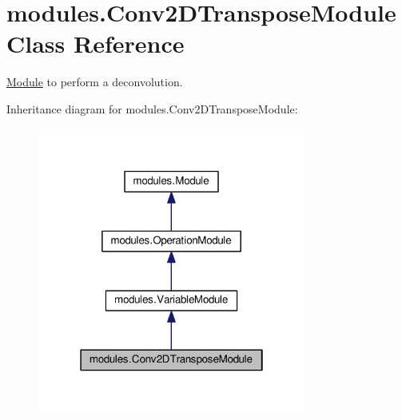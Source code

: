 \hypertarget{classmodules_1_1_conv2_d_transpose_module}{}\section{modules.\+Conv2\+D\+Transpose\+Module Class Reference}
\label{classmodules_1_1_conv2_d_transpose_module}


\hyperlink{classmodules_1_1_module}{Module} to perform a deconvolution.  




Inheritance diagram for modules.\+Conv2\+D\+Transpose\+Module\+:\nopagebreak
\begin{figure}[H]
\begin{center}
\leavevmode
\includegraphics[width=250pt]{classmodules_1_1_conv2_d_transpose_module__inherit__graph}
\end{center}
\end{figure}
